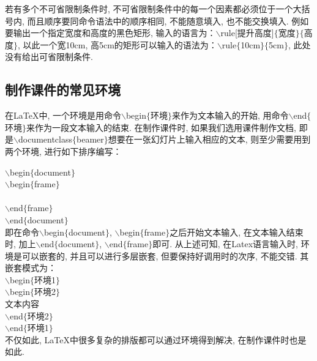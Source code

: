 若有多个不可省限制条件时, 不可省限制条件中的每一个因素都必须位于一个大括号内, 而且顺序要同命令语法中的顺序相同, 不能随意填入, 也不能交换填入. 例如要输出一个指定宽度和高度的黑色矩形, 输入的语言为：$\backslash$rule[提升高度]$\{$宽度$\}\{$高度$\}$, 以此一个宽10cm, 高5cm的矩形可以输入的语法为：$\backslash$rule$\{$10cm$\}\{$5cm$\}$, 此处没有给出可省限制条件.

\subsection{制作课件的常见环境}
在\LaTeX{}中, 一个环境是用命令$\backslash$begin$\{$环境$\}$来作为文本输入的开始, 用命令$\backslash$end$\{$环境$\}$来作为一段文本输入的结束. 在制作课件时, 如果我们选用课件制作文档, 即是$
\backslash$documentclass$\{$beamer$\}$想要在一张幻灯片上输入相应的文本, 则至少需要用到两个环境, 进行如下排序编写：

    $\backslash$begin$\{$document$\}$\\
    \indent$\backslash$begin$\{$frame$\}$\\
    \\
    \indent$\backslash$end$\{$frame$\}$\\
    \indent$\backslash$end$\{$document$\}$ \\
即在命令$\backslash$begin$\{$document$\}$, $\backslash$begin$\{$frame$\}$之后开始文本输入, 在文本输入结束时, 加上$\backslash$end$\{$document$\}$, $\backslash$end$\{$frame$\}$即可. 从上述可知, 在Latex语言输入时, 环境是可以嵌套的, 并且可以进行多层嵌套, 但要保持好调用时的次序, 不能交错. 其嵌套模式为：\\
    \indent $\backslash$begin$\{$环境1$\}$\\
    \indent $\backslash$begin$\{$环境2$\}$\\
    \indent 文本内容\\
    \indent $\backslash$end$\{$环境2$\}$\\
    \indent $\backslash$end$\{$环境1$\}$\\
不仅如此, \LaTeX{}中很多复杂的排版都可以通过环境得到解决, 在制作课件时也是如此.


